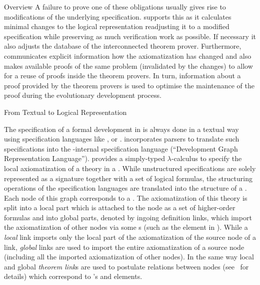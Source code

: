 \begin{omgroup}[id=maya,short=Maya,creators={autexier,hutter,mossakowski,shairer}]
\begin{omgroup}{Overview}
A failure to prove one of these obligations usually gives rise to modifications of the
underlying specification.  {\maya} supports this {} as it
calculates minimal changes to the logical representation readjusting it to a modified
specification while preserving as much verification work as possible.  If necessary it
also adjusts the database of the interconnected theorem prover.  Furthermore, {\maya}
communicates explicit information how the axiomatization has changed and also makes
available proofs of the same problem (invalidated by the changes) to allow for a reuse of
proofs inside the theorem provers. In turn, information about a proof provided by the
theorem provers is used to optimise the maintenance of the proof during the evolutionary
development process.
\end{omgroup}

\begin{omgroup}{From Textual to Logical Representation}

The specification of a formal development in {\maya} is always done in a textual way using
specification languages like {\casl} , {\omdoc} or {\vsesl}.  {\maya} incorporates parsers
to translate such specifications into the {\maya}-internal specification language {\dgrl}
(``Development Graph Representation Language'').  {\dgrl} provides a simply-typed
$\lambda$-calculus to specify the local axiomatization of a theory in a
{}. While unstructured specifications are solely represented
as a signature together with a set of logical formulas, the structuring operations of the
specification languages are translated into the structure of a
{}. Each node of this graph corresponds to a
{}. The axiomatization of this theory is split into a local part which is
attached to the node as a set of higher-order formulas and into global parts, denoted by
ingoing definition links, which import the axiomatization of other nodes via some
{s} (such as the {} element in {\omdoc}).
While a {\emph{local}} link imports only the local part of the
axiomatization of the source node of a link, {\emph{global}} links are
used to import the entire axiomatization of
\MAYAfigure
a source node (including all the imported axiomatization of other nodes).  In the same
way local and global {\emph{theorem link}s} are used to postulate relations between nodes
(see~\cite{AH-05-a} for details) which correspond to {\omdoc}'s
{} and {} elements.


\end{omgroup}
\end{omgroup}
